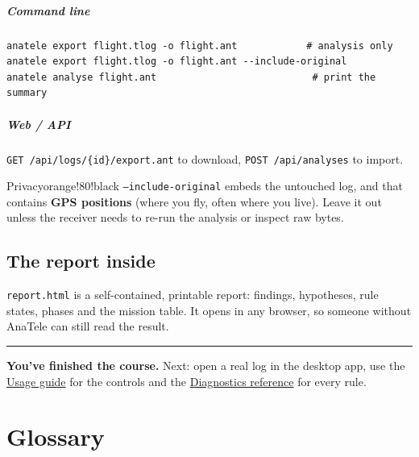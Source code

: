 \documentclass[11pt,a4paper,openany]{book}
\begin{document}
\paragraph{Command line}
\begin{verbatim}
anatele export flight.tlog -o flight.ant            # analysis only
anatele export flight.tlog -o flight.ant --include-original
anatele analyse flight.ant                           # print the summary
\end{verbatim}

\paragraph{Web / API}
\texttt{GET /api/logs/\{id\}/export.ant} to download, \texttt{POST /api/analyses} to import.

\begin{guidebox}{Privacy}{orange!80!black}
\texttt{--include-original} embeds the untouched log, and that contains \textbf{GPS positions} (where you fly, often where
you live). Leave it out unless the receiver needs to re-run the analysis or inspect raw bytes.

\end{guidebox}
\section{The report inside}

\texttt{report.html} is a self-contained, printable report: findings, hypotheses, rule states, phases and the mission
table. It opens in any browser, so someone without AnaTele can still read the result.

\medskip\hrule\medskip

\textbf{You've finished the course.} Next: open a real log in the desktop app, use the
\href{https://avinashistoocool.github.io/AnaTele/USAGE/}{Usage guide} for the controls and the \href{https://avinashistoocool.github.io/AnaTele/DIAGNOSTICS/}{Diagnostics reference} for every rule.
\appendix
\chapter{Glossary}
\end{document}
